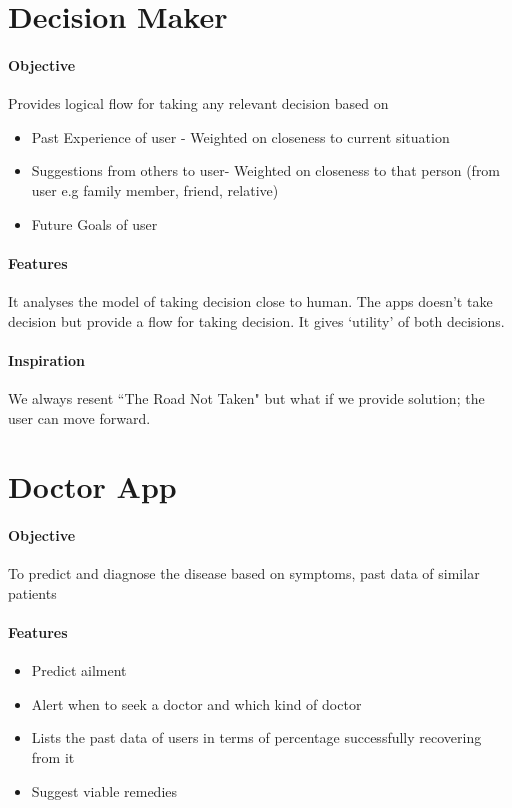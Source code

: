 \documentclass{article}
\begin{document}
\clearpage

\section{Decision Maker}
\paragraph{Objective}
Provides logical flow for taking any relevant decision based on
\begin{itemize}
    \item Past Experience of user - Weighted on closeness to current situation
    \item Suggestions from others to user- Weighted on closeness to that person (from user e.g family member, friend, relative)
    \item Future Goals of user
\end{itemize}
\paragraph{Features}
It analyses the model of taking decision close to human. The apps doesn't take decision but provide a flow for taking decision. It gives `utility' of both decisions. 
\paragraph{Inspiration}
We always resent ``The Road Not Taken" but what if we provide solution; the user can move forward.

\vspace{1cm}

\section{Doctor App}
\paragraph{Objective}
To predict and diagnose the disease based on symptoms, past data of similar patients
\paragraph{Features}
\begin{itemize}
    \item Predict ailment
    \item Alert when to seek a doctor and which kind of doctor
    \item Lists the past data of users in terms of percentage successfully recovering from it
    \item Suggest viable remedies
\end{itemize}
\end{document}
